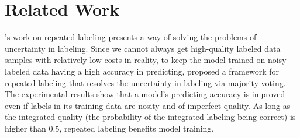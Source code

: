 \documentclass[11pt,letterpaper]{article}
\begin{document}
\section{Related Work}

's work on repeated labeling presents a way of solving the problems of uncertainty in labeling. Since we cannot always get high-quality labeled data samples with relatively low costs in reality, to keep the model trained on noisy labeled data having a high accuracy in predicting,  proposed a framework for repeated-labeling that resolves the uncertainty in labeling via majority voting. The experimental results show that a model's predicting accuracy is improved even if labels in its training data are nosity and of imperfect quality.  As long as the integrated quality (the probability of the integrated labeling being correct) is higher than 0.5, repeated labeling benefits model training. 
\end{document}
